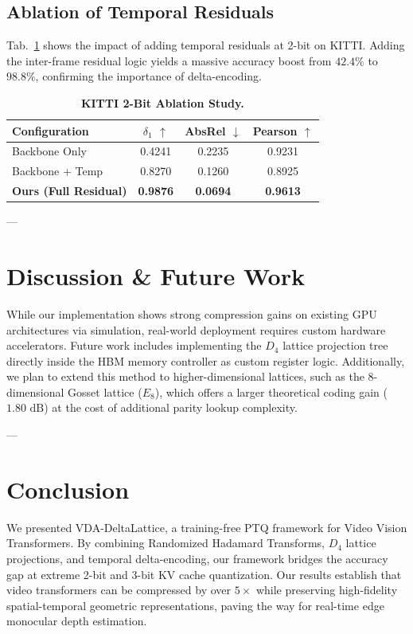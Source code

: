 \documentclass[10pt,twocolumn,letterpaper]{article}
\begin{document}
\subsection{Ablation of Temporal Residuals}
Tab.~\ref{tab:ablation} shows the impact of adding temporal residuals at 2-bit on KITTI. Adding the inter-frame residual logic yields a massive accuracy boost from $42.4\%$ to $98.8\%$, confirming the importance of delta-encoding.

\begin{table}[h]
\centering
\caption{\textbf{KITTI 2-Bit Ablation Study.}}
\label{tab:ablation}
\begin{tabular}{lccc}
\toprule
Configuration & $\delta_1$ $\uparrow$ & AbsRel $\downarrow$ & Pearson $\uparrow$ \\
\midrule
Backbone Only & 0.4241 & 0.2235 & 0.9231 \\
Backbone + Temp & 0.8270 & 0.1260 & 0.8925 \\
\textbf{Ours (Full Residual)} & \textbf{0.9876} & \textbf{0.0694} & \textbf{0.9613} \\
\bottomrule
\end{tabular}
\end{table}

---

\section{Discussion \& Future Work}
While our implementation shows strong compression gains on existing GPU architectures via simulation, real-world deployment requires custom hardware accelerators. Future work includes implementing the $D_4$ lattice projection tree directly inside the HBM memory controller as custom register logic. Additionally, we plan to extend this method to higher-dimensional lattices, such as the 8-dimensional Gosset lattice ($E_8$), which offers a larger theoretical coding gain ($1.80\text{ dB}$) at the cost of additional parity lookup complexity.

---

\section{Conclusion}
We presented VDA-DeltaLattice, a training-free PTQ framework for Video Vision Transformers. By combining Randomized Hadamard Transforms, $D_4$ lattice projections, and temporal delta-encoding, our framework bridges the accuracy gap at extreme 2-bit and 3-bit KV cache quantization. Our results establish that video transformers can be compressed by over $5\times$ while preserving high-fidelity spatial-temporal geometric representations, paving the way for real-time edge monocular depth estimation.
\end{document}
